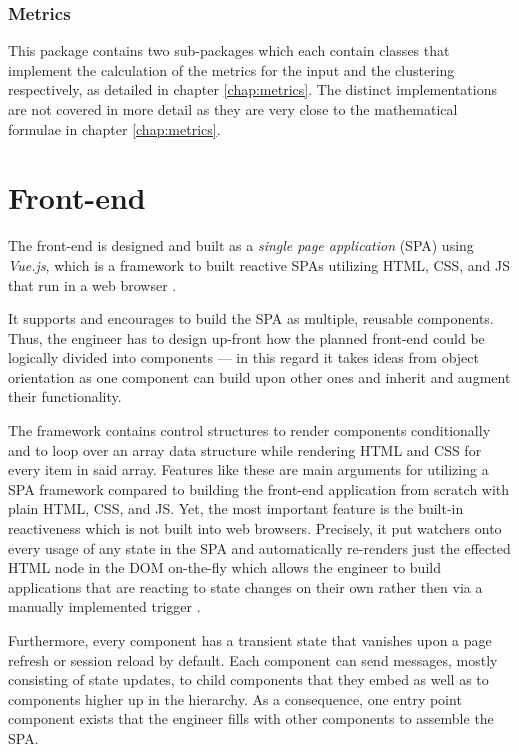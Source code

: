 \documentclass[12pt,a4paper]{report}
\begin{document}
\subsubsection{Metrics}
This package contains two sub-packages which each contain classes that implement
the calculation of the metrics for the input and the clustering respectively,
as detailed in chapter \ref{chap:metrics}.
The distinct implementations are not covered in more detail as they are very
close to the mathematical formulae in chapter \ref{chap:metrics}.



\section{Front-end} \label{sect:implementation-front-end}

The front-end is designed and built as a \textit{single page application} (SPA)
using \textit{Vue.js}, which is a framework to built reactive SPAs utilizing
HTML, CSS, and JS that run in a web browser \cite{vuejs}.

It supports and encourages to build the SPA as multiple, reusable components.
Thus, the engineer has to design up-front how the planned front-end could be
logically divided into components --- in this regard it takes ideas from
object orientation as one component can build upon other ones and inherit
and augment their functionality.

The framework contains control structures to render components conditionally
and to loop over an array data structure while rendering HTML and CSS for
every item in said array. Features like these are main arguments for utilizing
a SPA framework compared to building the front-end application from scratch
with plain HTML, CSS, and JS.
Yet, the most important feature is the built-in reactiveness which is not built
into web browsers. Precisely, it put watchers onto every usage of any state
in the SPA and automatically re-renders just the effected HTML node in the DOM
on-the-fly which allows the engineer to build applications that are reacting
to state changes on their own rather then via a manually implemented trigger
\cite{vuejs}.

Furthermore, every component has a transient state that vanishes upon a
page refresh or session reload by default. Each component can send messages,
mostly consisting of state updates, to child components that they embed as well
as to components higher up in the hierarchy.
As a consequence, one entry point component exists that the engineer fills
with other components to assemble the SPA.
\end{document}
